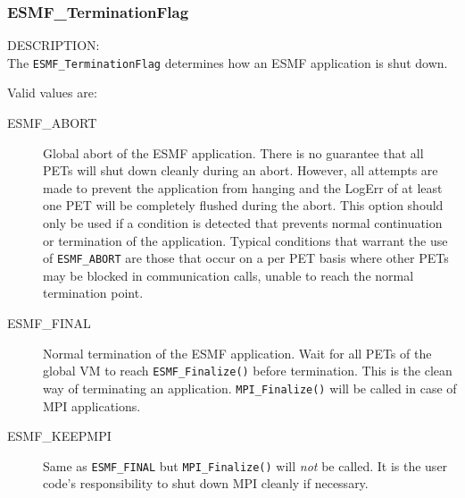 
\subsubsection{ESMF\_TerminationFlag}
\label{app:terminationflag}

{\sf DESCRIPTION:\\}
The {\tt ESMF\_TerminationFlag} determines how an ESMF application is shut down.

Valid values are:
\begin{description}
   \item [ESMF\_ABORT] 
         Global abort of the ESMF application. There is no guarantee 
         that all PETs will shut down cleanly during an abort. However, all
         attempts are made to prevent the application from hanging and the
         LogErr of at least one PET will be completely flushed during the abort.
         This option should only be used if a condition is detected that
         prevents normal continuation or termination of the application.
         Typical conditions that warrant the use of {\tt ESMF\_ABORT} are those
         that occur on a per PET basis where other PETs may be blocked in 
         communication calls, unable to reach the normal termination point.
   \item [ESMF\_FINAL]
         Normal termination of the ESMF application. Wait for all PETs of the
         global VM to reach {\tt ESMF\_Finalize()} before termination. This is
         the clean way of terminating an application. {\tt MPI\_Finalize()} will
         be called in case of MPI applications.
   \item [ESMF\_KEEPMPI]
         Same as {\tt ESMF\_FINAL} but {\tt MPI\_Finalize()} will {\em not}
         be called. It is the user code's responsibility to shut down MPI
         cleanly if necessary.
\end{description}
